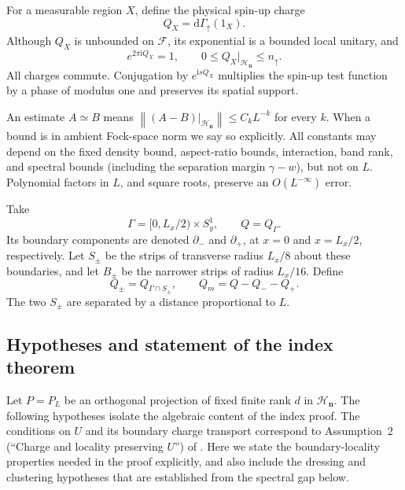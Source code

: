 \documentclass[11pt]{article}
\theoremstyle{definition}
\theoremstyle{remark}
\newcommand{\ii}{\mathrm i}
\newcommand{\dG}{\mathrm d\Gamma}
\newcommand{\HH}{\mathcal H}
\newcommand{\FF}{\mathcal F}
\newcommand{\up}{\uparrow}
\newcommand{\epsL}{O(L^{-\infty})}
\newcommand{\eqL}{\simeq}
\newcommand{\norm}[1]{\left\lVert#1\right\rVert}
\begin{document}
For a measurable region \(X\), define the physical spin-up charge
\[
 Q_X=\dG_\up(1_X).
\]
Although \(Q_X\) is unbounded on \(\FF\), its exponential is a
bounded local unitary, and
\begin{equation}\label{eq:integercharge}
 e^{2\pi\ii Q_X}=1,\qquad
 0\le Q_X|_{\HH_{\bm n}}\le n_\up.
\end{equation}
All charges commute.  Conjugation by \(e^{\ii sQ_X}\) multiplies the
spin-up test function by a phase of modulus one and preserves its
spatial support.

An estimate \(A\eqL B\) means
\(\norm{(A-B)|_{\HH_{\bm n}}}\le C_kL^{-k}\) for every \(k\).
When a bound is in ambient Fock-space norm we say so explicitly.
All constants may depend on the fixed density bound, aspect-ratio
bounds, interaction, band rank, and spectral bounds (including the
separation margin \(\gamma-w\)), but not on \(L\).
Polynomial factors in \(L\), and square roots, preserve an
\(\epsL\) error.

Take
\[
 \Gamma=[0,L_x/2)\times S_y^1,\qquad Q=Q_\Gamma.
\]
Its boundary components are denoted \(\partial_-\) and \(\partial_+\),
at \(x=0\) and \(x=L_x/2\), respectively.  Let \(S_\pm\) be the
strips of transverse radius \(L_x/8\) about these boundaries, and
let \(B_\pm\) be the narrower strips of radius \(L_x/16\).
Define
\[
 Q_\pm=Q_{\Gamma\cap S_\pm},\qquad Q_m=Q-Q_--Q_+.
\]
The two \(S_\pm\) are separated by a distance proportional to \(L\).

\subsection{Hypotheses and statement of the index theorem}

Let \(P=P_L\) be an orthogonal projection of fixed finite rank \(d\)
in \(\HH_{\bm n}\).  The following hypotheses isolate the algebraic
content of the index proof.  The conditions on \(U\) and its
boundary charge transport correspond to Assumption~2
(``Charge and locality preserving \(U\)'') of \cite{BBDF21}.
Here we state the boundary-locality properties needed in the proof
explicitly, and also include the dressing and clustering hypotheses
that are established from the spectral gap below.
\end{document}
